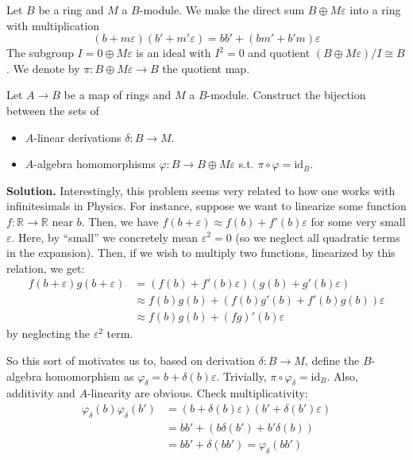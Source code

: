 \documentclass{template}
\begin{document}
\begin{problem}[Exercise 5]
    Let $B$ be a ring and $M$ a $B$-module. We make the direct sum 
    $B \oplus M\varepsilon$ into a ring with multiplication
    \begin{equation*}
        (b+m\varepsilon)(b'+m'\varepsilon) = bb' + (bm' + b'm)\varepsilon
    \end{equation*}
    The subgroup $I = 0 \oplus M\varepsilon$ is an ideal with $I^2=0$ 
    and quotient $(B\oplus M\varepsilon)/I \cong B$. We denote by 
    $\pi: B \oplus M\varepsilon \to B$ the quotient map. 

    Let $A \to B$ be a map of rings and $M$ a $B$-module. Construct the bijection 
    between the sets of
    \begin{itemize}
        \item $A$-linear derivations $\delta: B \to M$.
        \item $A$-algebra homomorphisms $\varphi: B \to B \oplus M\varepsilon$
        s.t. $\pi \circ \varphi = \text{id}_B$.
    \end{itemize}
\end{problem}

\textbf{Solution.} Interestingly, this problem seems very related to how one
works with infinitesimals in Physics. For instance, suppose we want to linearize
some function $f: \mathbb{R} \to \mathbb{R}$ near $b$. Then, we have
$f(b+\varepsilon) \approx f(b) + f'(b)\varepsilon$ for some very small
$\varepsilon$. Here, by ``small'' we concretely mean $\varepsilon^2=0$ (so we
neglect all quadratic terms in the expansion). Then, if we wish to multiply 
two functions, linearized by this relation, we get:
\begin{align*}
    f(b+\varepsilon)g(b+\varepsilon) &= (f(b) + f'(b)\varepsilon)(g(b) + g'(b)\varepsilon) \\
    &\approx f(b)g(b) + (f(b)g'(b) + f'(b)g(b))\varepsilon \\
    &\approx f(b)g(b) + (fg)'(b)\varepsilon
\end{align*}
by neglecting the $\varepsilon^2$ term.

So this sort of motivates us to, based on derivation $\delta: B \to M$, define
the $B$-algebra homomorphism as $\varphi_{\delta} = b + \delta(b)\varepsilon$.
Trivially, $\pi \circ \varphi_{\delta} = \text{id}_B$. Also, additivity 
and $A$-linearity are obvious. Check multiplicativity:
\begin{align*}
    \varphi_{\delta}(b)\varphi_{\delta}(b') &= (b+\delta(b)\varepsilon)(b'+\delta(b')\varepsilon)\\
    &= bb' + (b\delta(b') + b'\delta(b)) \\
    &= bb' + \delta(bb') = \varphi_{\delta}(bb')
\end{align*}
\end{document}
